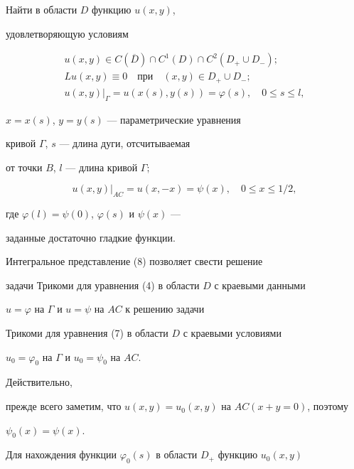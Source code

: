 Найти в области $D$ функцию $u(x,y)$,


удовлетворяющую условиям


\begin{gather}


u(x,y) \in C(\overline D)\cap C^1(D) \cap C^2(D_+\cup D_-);\\


%


Lu(x,y)\equiv 0 \quad \text{при}\quad (x,y)\in D_+\cup D_-;\\


%


u(x,y)\big|_\Gamma=u(x(s),y(s))=\varphi (s),


\quad 0\le s\le l,


\end{gather}


$x=x(s)$, $y=y(s)$ --- параметрические уравнения 


кривой $\Gamma$, $s$ --- длина дуги, отсчитываемая


от точки $B$, $l$ --- длина кривой $\Gamma;$


\begin{equation}


u(x,y)\big|_{AC}=u(x,-x)=\psi (x),\quad 0\le x \le 1/2,


\end{equation}


где $\varphi (l)=\psi (0)$, $\varphi (s)$ и $\psi (x)$ ---


заданные достаточно гладкие функции.


\medskip





Интегральное представление (8) позволяет свести решение


задачи Трикоми для уравнения (4) в области $D$ с краевыми данными


$u=\varphi $ на $\Gamma$ и $u=\psi$ на $AC$ к решению задачи


Трикоми для уравнения (7) в области $D$ с краевыми условиями


$u_0=\varphi_0$ на $\Gamma$ и $u_0=\psi_0$ на $AC$.





Действительно,


прежде всего заметим, что $u(x,y)=u_0(x,y)$ на $AC(x+y=0)$, поэтому


$\psi_0(x)=\psi(x)$.


Для нахождения функции $\varphi_0(s)$ в области $D_+$ функцию $u_0(x,y)$


